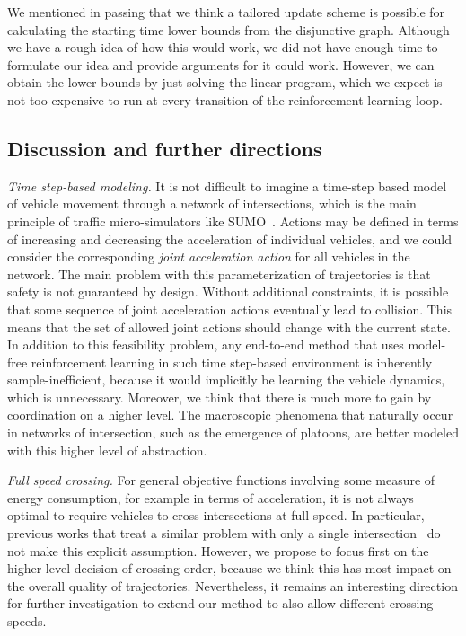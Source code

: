 \documentclass{article}
\theoremstyle{definition}
\theoremstyle{plain}
\begin{document}
We mentioned in passing that we think a tailored update scheme is possible for
calculating the starting time lower bounds from the disjunctive graph. Although
we have a rough idea of how this would work, we did not have enough time to
formulate our idea and provide arguments for it could work. However, we can
obtain the lower bounds by just solving the linear program, which we expect is
not too expensive to run at every transition of the reinforcement learning loop.

\subsection{Discussion and further directions}


\textit{Time step-based modeling.}
%
It is not difficult to imagine a time-step based model of vehicle movement through
a network of intersections, which is the main principle of traffic
micro-simulators like SUMO~\cite{lopezMicroscopicTrafficSimulation2018}. Actions may be defined in terms of increasing
and decreasing the acceleration of individual vehicles, and we could consider the
corresponding \textit{joint acceleration action} for all vehicles in the network.
%
The main problem with this parameterization of trajectories is that safety is
not guaranteed by design. Without additional constraints, it is possible that
some sequence of joint acceleration actions eventually lead to collision. This
means that the set of allowed joint actions should change with the current
state.
%
In addition to this feasibility problem, any end-to-end method that uses
model-free reinforcement learning in such time step-based environment is
inherently sample-inefficient, because it would implicitly be learning the
vehicle dynamics, which is unnecessary.
%
Moreover, we think that there is much more to gain by coordination on a higher
level. The macroscopic phenomena that naturally occur in networks of
intersection, such as the emergence of platoons, are better modeled with this
higher level of abstraction.

\vspace{0.5em}\noindent
\textit{Full speed crossing.} For general objective functions involving some
measure of energy consumption, for example in terms of acceleration, it is not
always optimal to require vehicles to cross intersections at full speed. In
particular, previous works that treat a similar problem with only a single
intersection~\cite{hultApproximateSolutionOptimal2015,zhaoBilevelProgrammingModel2021}
do not make this explicit assumption. However, we propose to focus first on the
higher-level decision of crossing order, because we think this has most impact
on the overall quality of trajectories. Nevertheless, it remains an interesting
direction for further investigation to extend our method to also allow different
crossing speeds.
\end{document}
